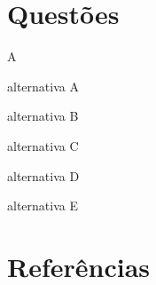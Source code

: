 \documentclass[11pt]{article}
\begin{document}
\section{Questões}
\begin{questaoautoral}{A}
\alternativas
\item alternativa A
\item alternativa B
\item alternativa C
\item alternativa D
\item alternativa E
\fimalternativas
\end{questaoautoral}
\imprimirgabarito

\section{Referências}
\end{document}
